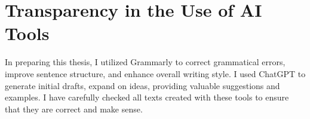 \chapter*{Transparency in the Use of AI Tools}

In preparing this thesis, I utilized Grammarly to correct grammatical errors, improve sentence structure, and enhance overall writing style. I used ChatGPT to generate initial drafts, expand on ideas, providing valuable suggestions and examples. I have carefully checked all texts created with these tools to ensure that they are correct and make sense.

\clearpage{}
